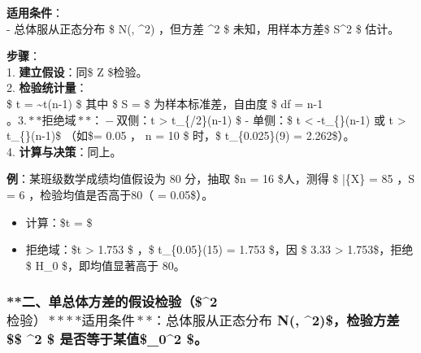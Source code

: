 \textbf{适用条件}：\\
- 总体服从正态分布 \$ N(\mu, \sigma\^{}2) \(，但方差\) \sigma\^{}2 \$
未知，用样本方差\$ S\^{}2 \$ 估计。

\textbf{步骤}：\\
1. \textbf{建立假设}：同\$ Z \$检验。\\
2. \textbf{检验统计量}：\\
\$ t =  \sim t(n-1) \$ 其中 \$ S =
 \$
为样本标准差，自由度 \$ df =
n-1\(。 3. **拒绝域**：  - 双侧：\)\textbar{}t\textbar{} \textgreater{}
t\_\{\alpha/2\}(n-1) \$ - 单侧：\$ t \textless{} -t\_\{\alpha\}(n-1)
\(或\) t \textgreater{} t\_\{\alpha\}(n-1)\$ （如\$\alpha = 0.05 \(，\)
n = 10 \$ 时，\$ t\_\{0.025\}(9) = 2.262\$）。\\
4. \textbf{计算与决策}：同上。

\textbf{例}：某班级数学成绩均值假设为 80 分，抽取 \$n = 16 \$人，测得 \$
\bar\{X\} = 85 \(，\)S = 6 \(，检验均值是否高于 80（\) \alpha =
0.05\$）。

\begin{itemize}
\tightlist
\item
  计算：\$t =   \$
\item
  拒绝域：\$t \textgreater{} 1.753 \$ ，\$ t\_\{0.05\}(15) = 1.753
  \$，因 \$ 3.33 \textgreater{} 1.753\$，拒绝 \$ H\_0 \$，即均值显著高于
  80。
\end{itemize}

\hypertarget{ux4e8cux5355ux603bux4f53ux65b9ux5deeux7684ux5047ux8bbeux68c0ux9a8c2-ux68c0ux9a8c-ux9002ux7528ux6761ux4ef6ux603bux4f53ux670dux4eceux6b63ux6001ux5206ux5e03-n-2ux68c0ux9a8cux65b9ux5dee-2-ux662fux5426ux7b49ux4e8eux67d0ux503c_02}{%
\subsubsection{\texorpdfstring{**二、单总体方差的假设检验（\$\chi\^{}2
\(检验）** **适用条件**：总体服从正态分布\) N(\mu,
\sigma\^{}2)\$，检验方差 \$\$ \sigma\^{}2 \$
是否等于某值\$\sigma\_0\^{}2
\$。}{**二、单总体方差的假设检验（\$\^{}2 检验）** **适用条件**：总体服从正态分布 N(, \^{}2)\$，检验方差 \$\$ \^{}2 \$ 是否等于某值\$\_0\^{}2 \$。}}\label{ux4e8cux5355ux603bux4f53ux65b9ux5deeux7684ux5047ux8bbeux68c0ux9a8c2-ux68c0ux9a8c-ux9002ux7528ux6761ux4ef6ux603bux4f53ux670dux4eceux6b63ux6001ux5206ux5e03-n-2ux68c0ux9a8cux65b9ux5dee-2-ux662fux5426ux7b49ux4e8eux67d0ux503c_02}}

